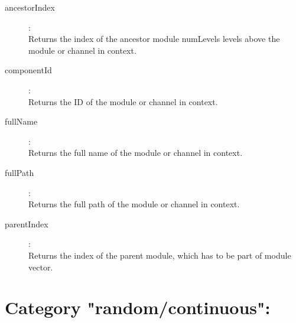 \begin{description}
\item[ancestorIndex]:  \\
    Returns the index of the ancestor module numLevels levels above the module
    or channel in context.

\item[componentId]:  \\
    Returns the ID of the module or channel in context.

\item[fullName]:  \\
    Returns the full name of the module or channel in context.

\item[fullPath]:  \\
    Returns the full path of the module or channel in context.

\item[parentIndex]:  \\
    Returns the index of the parent module, which has to be part of module
    vector.


\end{description}

\section{Category "random/continuous":}
\label{sec:ned-functions:category-random-continuous}

